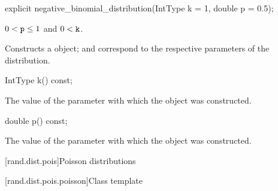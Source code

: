 %
\begin{itemdecl}
explicit negative_binomial_distribution(IntType k = 1, double p = 0.5);
\end{itemdecl}

\begin{itemdescr}
\pnum\requires
 $0 < \texttt{p} \leq 1$
 and $0 < \texttt{k} $.

\pnum\effects Constructs a  object;
  and 
 correspond to the respective parameters of the distribution.
\end{itemdescr}

%
%
\begin{itemdecl}
IntType k() const;
\end{itemdecl}

\begin{itemdescr}
\pnum\returns The value of the  parameter
 with which the object was constructed.
\end{itemdescr}

%
%
\begin{itemdecl}
double p() const;
\end{itemdecl}

\begin{itemdescr}
\pnum\returns The value of the  parameter
 with which the object was constructed.
\end{itemdescr}%
%



[rand.dist.pois]{Poisson distributions}%
%


[rand.dist.pois.poisson]{Class template }%
%


